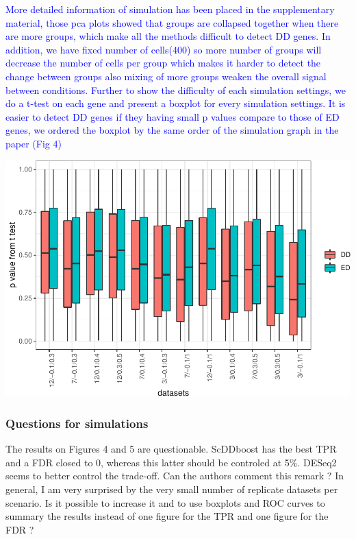 \documentclass[]{article}
\begin{document}
\textcolor{blue}{More detailed information of simulation has been placed in the supplementary material, those pca plots showed that groups are collapsed together when there are more groups, which make all the methods difficult to detect DD genes. In addition, we have fixed number of cells(400) so more number of groups will decrease the number of cells per group which makes it harder to detect the change between groups also mixing of more groups weaken the overall signal between conditions.
Further to show the difficulty of each simulation settings, we do a t-test on each gene and present a boxplot for every simulation settings. It is easier to detect DD genes if they having small p values compare to those of ED genes, we ordered the boxplot by the same order of the simulation graph in the paper (Fig 4)}

\includegraphics{Revision_files/figure-latex/unnamed-chunk-2-1.pdf}

\subsubsection{Questions for
simulations}\label{questions-for-simulations-1}

The results on Figures 4 and 5 are questionable. ScDDboost has the best
TPR and a FDR closed to 0, whereas this latter should be controled at
5\%. DESeq2 seems to better control the trade-off. Can the authors
comment this remark ? In general, I am very surprised by the very small
number of replicate datasets per scenario. Is it possible to increase it
and to use boxplots and ROC curves to summary the results instead of one
figure for the TPR and one figure for the FDR ?
\end{document}

